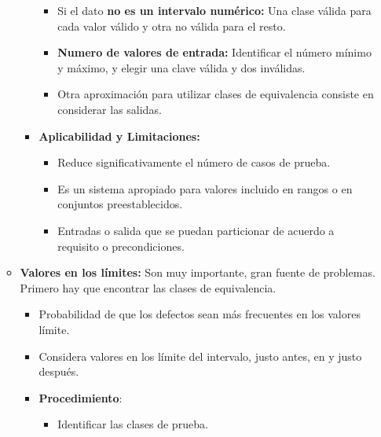 \documentclass[12pt, twoside, openright]{report} %
\begin{document}
\begin{itemize}
\begin{itemize}
\begin{itemize}
\begin{itemize}
      \item Si el dato \textbf{no es un intervalo numérico:} Una clase
        válida para cada valor válido y otra no válida para el resto.
        
      \item \textbf{Numero de valores de entrada:} Identificar el número
        mínimo y máximo, y elegir una clave válida y dos inválidas.
        
      \item Otra aproximación para utilizar clases de equivalencia consiste
        en considerar las salidas.
        
      \end{itemize}
    \item \textbf{Aplicabilidad y Limitaciones:}
      

      \begin{itemize}
      \item Reduce significativamente el número de casos de prueba.
        
      \item Es un sistema apropiado para valores incluido en rangos o en
        conjuntos preestablecidos.
        
      \item Entradas o salida que se puedan particionar de acuerdo a
        requisito o precondiciones.
        
      \end{itemize}
    \end{itemize}
  \item \textbf{Valores en los límites:} Son muy importante, gran fuente de
    problemas. Primero hay que encontrar las clases de equivalencia.
    

    \begin{itemize}
    \item Probabilidad de que los defectos sean más frecuentes en los
      valores límite.
      
    \item Considera valores en los límite del intervalo, justo antes, en y
      justo después.
      
    \end{itemize}

    \begin{itemize}
    \item \textbf{Procedimiento}:
      

      \begin{itemize}
      \item Identificar las clases de prueba.
        

\end{itemize}
\end{itemize}
\end{itemize}
\end{itemize}
\end{document}
